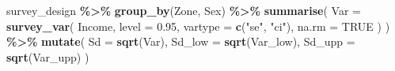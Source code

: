 \documentclass[
  spanish,
  12pt,
]{book}
\newenvironment{Shaded}{\begin{snugshade}}{\end{snugshade}}
\newcommand{\AttributeTok}[1]{\textcolor[rgb]{0.13,0.29,0.53}{#1}}
\newcommand{\ConstantTok}[1]{\textcolor[rgb]{0.56,0.35,0.01}{#1}}
\newcommand{\FloatTok}[1]{\textcolor[rgb]{0.00,0.00,0.81}{#1}}
\newcommand{\FunctionTok}[1]{\textcolor[rgb]{0.13,0.29,0.53}{\textbf{#1}}}
\newcommand{\NormalTok}[1]{#1}
\newcommand{\SpecialCharTok}[1]{\textcolor[rgb]{0.81,0.36,0.00}{\textbf{#1}}}
\newcommand{\StringTok}[1]{\textcolor[rgb]{0.31,0.60,0.02}{#1}}
\begin{document}
\begin{Shaded}
\begin{Highlighting}[]
\NormalTok{survey\_design }\SpecialCharTok{\%\textgreater{}\%}
  \FunctionTok{group\_by}\NormalTok{(Zone, Sex) }\SpecialCharTok{\%\textgreater{}\%}
  \FunctionTok{summarise}\NormalTok{(}
    \AttributeTok{Var =} \FunctionTok{survey\_var}\NormalTok{(}
\NormalTok{      Income,}
      \AttributeTok{level =} \FloatTok{0.95}\NormalTok{,}
      \AttributeTok{vartype =} \FunctionTok{c}\NormalTok{(}\StringTok{"se"}\NormalTok{, }\StringTok{"ci"}\NormalTok{),}
      \AttributeTok{na.rm =} \ConstantTok{TRUE}
\NormalTok{    )}
\NormalTok{  ) }\SpecialCharTok{\%\textgreater{}\%}
  \FunctionTok{mutate}\NormalTok{(}
    \AttributeTok{Sd     =} \FunctionTok{sqrt}\NormalTok{(Var),}
    \AttributeTok{Sd\_low =} \FunctionTok{sqrt}\NormalTok{(Var\_low),}
    \AttributeTok{Sd\_upp =} \FunctionTok{sqrt}\NormalTok{(Var\_upp)}
\NormalTok{  )}
\end{Highlighting}
\end{Shaded}
\end{document}
